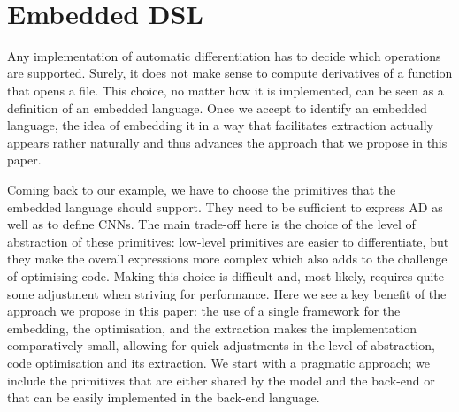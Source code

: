 \begin{code}[hide]%
\>[0]\AgdaSpace{}%
\AgdaSpace{}%
\<%
\\
\>[0]\AgdaSpace{}%
\AgdaSpace{}%
\<%
\\
\>[0]\AgdaSpace{}%
\AgdaSpace{}%
\AgdaSpace{}%
\AgdaSpace{}%
\AgdaSymbol{(}\AgdaSymbol{;}\AgdaSpace{}%
\AgdaInductiveConstructor{[]}\AgdaSymbol{;}\AgdaSpace{}%
\AgdaSymbol{)}\<%
\\
\>[0]\AgdaSpace{}%
\AgdaSpace{}%
\<%
\\
\>[0]\AgdaSpace{}%
\AgdaSpace{}%
\<%
\\
%
\\[\AgdaEmptyExtraSkip]%
\>[0]\<%
\\
\>[0]\AgdaSpace{}%
\AgdaSpace{}%
\<%
\\
\>[0]\AgdaSpace{}%
\AgdaModule{\AgdaUnderscore{}}\AgdaSpace{}%
\<%
\end{code}
\section{Embedded DSL}

Any implementation of automatic differentiation has to decide which operations
are supported.  Surely, it does not make sense to compute derivatives
of a function that opens a file.  This choice, no matter how it is implemented,
can be seen as a definition of an embedded language.
Once we accept to identify an embedded language, the idea of embedding it in a way
that facilitates extraction actually appears rather naturally and thus advances
the approach that we propose in this paper.

Coming back to our example, we have to choose the primitives that the embedded language
should support. They need to be sufficient to express AD as well as to define CNNs.
The main trade-off here is the choice of the level of abstraction of these primitives:
low-level primitives are easier to differentiate, but they make the overall expressions
more complex which also adds to the challenge of optimising code.
Making this choice is difficult and, most likely, requires quite some adjustment 
when striving for performance.
Here we see a key benefit of the approach we propose in this paper:
the use of a single framework for the embedding, the optimisation, and the extraction
makes the implementation comparatively small, allowing for quick adjustments in the
level of abstraction, code optimisation and its extraction.
We start with a pragmatic approach; we include the primitives that are either shared
by the model and the back-end
or that can be easily implemented in the back-end language.

